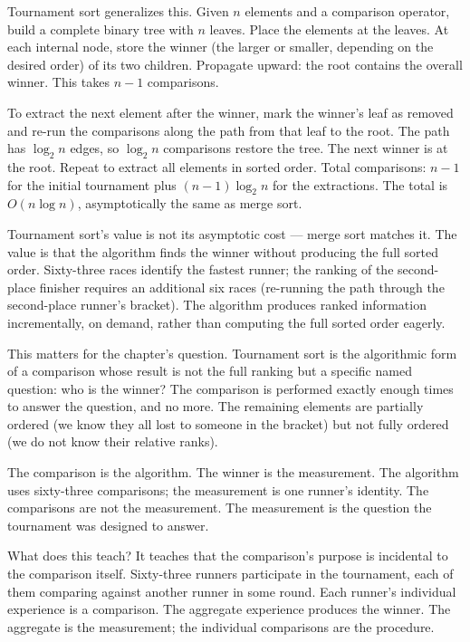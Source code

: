 Tournament sort generalizes this. Given $n$ elements and a comparison
operator, build a complete binary tree with $n$ leaves. Place the elements
at the leaves. At each internal node, store the winner (the larger or
smaller, depending on the desired order) of its two children. Propagate
upward: the root contains the overall winner. This takes $n - 1$
comparisons.

To extract the next element after the winner, mark the winner's leaf as
removed and re-run the comparisons along the path from that leaf to the
root. The path has $\log_2 n$ edges, so $\log_2 n$ comparisons restore the
tree. The next winner is at the root. Repeat to extract all elements in
sorted order. Total comparisons: $n - 1$ for the initial tournament plus
$(n-1) \log_2 n$ for the extractions. The total is $O(n \log n)$,
asymptotically the same as merge sort.

Tournament sort's value is not its asymptotic cost --- merge sort matches
it. The value is that the algorithm finds the winner without producing the
full sorted order. Sixty-three races identify the fastest runner; the
ranking of the second-place finisher requires an additional six races
(re-running the path through the second-place runner's bracket). The
algorithm produces ranked information incrementally, on demand, rather
than computing the full sorted order eagerly.

This matters for the chapter's question. Tournament sort is the
algorithmic form of a comparison whose result is not the full ranking but
a specific named question: who is the winner? The comparison is performed
exactly enough times to answer the question, and no more. The remaining
elements are partially ordered (we know they all lost to someone in the
bracket) but not fully ordered (we do not know their relative ranks).

The comparison is the algorithm. The winner is the measurement. The
algorithm uses sixty-three comparisons; the measurement is one runner's
identity. The comparisons are not the measurement. The measurement is the
question the tournament was designed to answer.

What does this teach? It teaches that the comparison's purpose is
incidental to the comparison itself. Sixty-three runners participate in
the tournament, each of them comparing against another runner in some
round. Each runner's individual experience is a comparison. The aggregate
experience produces the winner. The aggregate is the measurement; the
individual comparisons are the procedure.

